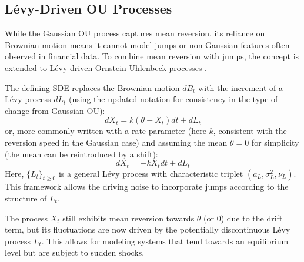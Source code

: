\documentclass[11pt,twoside,openright]{report}
\begin{document}
\subsection{Lévy-Driven OU Processes}
\label{subsec:levy_ou}

While the Gaussian OU process captures mean reversion, its reliance on Brownian motion means it cannot model jumps or non-Gaussian features often observed in financial data. To combine mean reversion with jumps, the concept is extended to Lévy-driven Ornstein-Uhlenbeck processes \cite{barndorff2001non}.

The defining SDE replaces the Brownian motion $dB_t$ with the increment of a Lévy process $dL_t$ (using the updated notation for consistency in the type of change from Gaussian OU):
\begin{equation}
dX_t = k (\theta - X_t) dt + dL_t
\label{eq:levy_ou_general}
\end{equation}
or, more commonly written with a rate parameter (here $k$, consistent with the reversion speed in the Gaussian case) and assuming the mean $\theta = 0$ for simplicity (the mean can be reintroduced by a shift):
\begin{equation}
dX_t = -k X_t dt + dL_t
\label{eq:levy_ou_zero_mean}
\end{equation}
Here, $\{L_t\}_{t \ge 0}$ is a general Lévy process with characteristic triplet $(a_L, \sigma_L^2, \nu_L)$. This framework allows the driving noise to incorporate jumps according to the structure of $L_t$.

The process $X_t$ still exhibits mean reversion towards $\theta$ (or 0) due to the drift term, but its fluctuations are now driven by the potentially discontinuous Lévy process $L_t$. This allows for modeling systems that tend towards an equilibrium level but are subject to sudden shocks.
\end{document}
